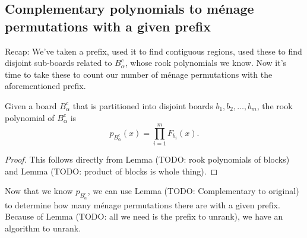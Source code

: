 

\subsection{Complementary polynomials to m\'enage permutations with a given prefix}
Recap: We've taken a prefix, used it to find contiguous regions, used these to
find disjoint sub-boards related to $B_\alpha^c$, whose rook polynomials we know.
Now it's time to take these to count our number of m\'enage permutations with
the aforementioned prefix.
\begin{lemma}
  Given a board $B_\alpha^c$ that is partitioned into disjoint boards
  $b_1, b_2, \dots, b_m$, the rook polynomial of $B_\alpha^c$ is \[
    p_{B_\alpha^c}(x) = \prod_{i = 1}^m F_{b_i}(x).
  \]
\end{lemma}
\begin{proof}
  This follows directly from Lemma (TODO: rook polynomials of blocks)
  and Lemma (TODO: product of blocks is whole thing).
\end{proof}

Now that we know $p_{B_\alpha^c}$, we can use Lemma
(TODO: Complementary to original) to determine how many
m\'enage permutations there are with a given prefix. Because of Lemma
(TODO: all we need is the prefix to unrank), we have an algorithm to unrank.

